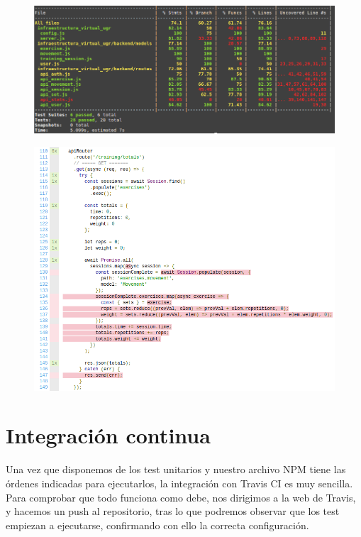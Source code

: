 \begin{figure}
  \begin{center}
    \includegraphics[width=\textwidth]{imagenes/cov.png}
    \caption{}
    \label{fig:}
  \end{center}
\end{figure}
\begin{figure}
  \begin{center}
    \includegraphics[width=\textwidth]{imagenes/cov_detail.png}
    \caption{}
    \label{fig:}
  \end{center}
\end{figure}

\section {Integración continua}
Una vez que disponemos de los test unitarios y nuestro archivo NPM tiene las órdenes indicadas para ejecutarlos, la integración con Travis CI es muy sencilla. Para comprobar que todo funciona como debe, nos dirigimos a la web de Travis, y hacemos un push al repositorio, tras lo que podremos observar que los test empiezan a ejecutarse, confirmando con ello la correcta configuración.

